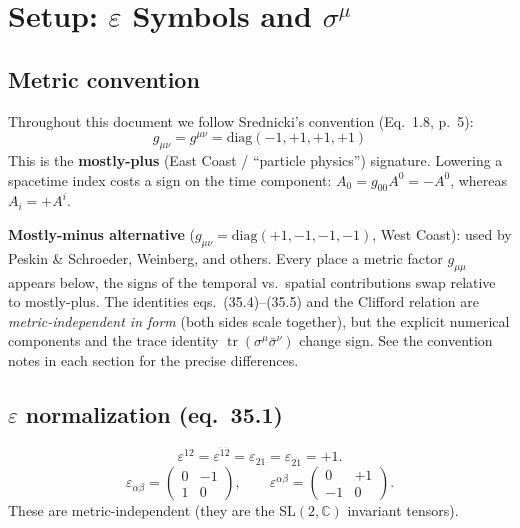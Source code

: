 \section{Setup: \texorpdfstring{$\varepsilon$}{epsilon} Symbols
         and \texorpdfstring{$\sigma^\mu$}{sigma\^{}mu}}

\subsection{Metric convention}

Throughout this document we follow Srednicki's convention (Eq.~1.8, p.~5):
\begin{equation}
  \boxed{g_{\mu\nu} = g^{\mu\nu} = \mathrm{diag}(-1,+1,+1,+1)}
  \tag{1.8}
\end{equation}
This is the \textbf{mostly-plus} (East Coast / ``particle physics'') signature.
Lowering a spacetime index costs a sign on the time component:
$A_0 = g_{00}A^0 = -A^0$, whereas $A_i = +A^i$.

\begin{metricnote}
\textbf{Mostly-minus alternative} ($g_{\mu\nu} = \mathrm{diag}(+1,-1,-1,-1)$, West Coast):
used by Peskin \& Schroeder, Weinberg, and others.
Every place a metric factor $g_{\mu\mu}$ appears below, the signs of the
temporal vs.\ spatial contributions swap relative to mostly-plus.
The identities eqs.~(35.4)--(35.5) and the Clifford relation are
\emph{metric-independent in form} (both sides scale together), but
the explicit numerical components and the trace identity
$\operatorname{tr}(\sigma^\mu\bar\sigma^\nu)$ change sign.
See the convention notes in each section for the precise differences.
\end{metricnote}

\subsection{\texorpdfstring{$\varepsilon$}{epsilon} normalization (eq.~35.1)}
\begin{equation}
  \varepsilon^{12} = \varepsilon^{\dot{1}\dot{2}}
  = \varepsilon_{21} = \varepsilon_{\dot{2}\dot{1}} = +1.
  \tag{35.1}
\end{equation}
\[
  \varepsilon_{\alpha\beta} = \begin{pmatrix}0 & -1\\1 & 0\end{pmatrix},\qquad
  \varepsilon^{\alpha\beta} = \begin{pmatrix}0 & +1\\-1 & 0\end{pmatrix}.
\]
These are metric-independent (they are the SL$(2,\mathbb{C})$ invariant tensors).

